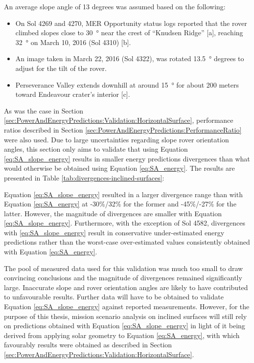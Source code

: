 An average slope angle of 13 degrees was assumed based on the following:
\begin{itemize}
  \item On Sol 4269 and 4270, \ac{MER} Opportunity status logs reported that the rover climbed slopes close to \SI{30}{\degree} near the crest of ``Knudsen Ridge'' [a], reaching \SI{32}{\degree} on March 10, 2016 (Sol 4310) [b].
  \item An image taken in March 22, 2016 (Sol 4322), was rotated \SI{13.5}{\degree} degrees to adjust for the tilt of the rover.
  \item Perseverance Valley extends downhill at around \SI{15}{\degree} for about 200 meters toward Endeavour crater's interior [c].
\end{itemize}

As was the case in Section \ref{sec:PowerAndEnergyPredictions:Validation:HorizontalSurface}, performance ratios described in Section \ref{sec:PowerAndEnergyPredictions:PerformanceRatio} were also used. Due to large uncertainties regarding slope rover orientation angles, this section only aims to validate that using Equation \ref{eq:SA_slope_energy} results in smaller energy predictions divergences than what would otherwise be obtained using Equation \ref{eq:SA_energy}. The results are presented in Table \ref{tab:divergences-inclined-surfaces}:



Equation \ref{eq:SA_slope_energy} resulted in a larger divergence range than with Equation \ref{eq:SA_energy} at -30\%/32\% for the former and -45\%/-27\% for the latter. However, the magnitude of divergences are smaller with Equation \ref{eq:SA_slope_energy}. Furthermore, with the exception of Sol 4582, divergences with \ref{eq:SA_slope_energy} result in conservative under-estimated energy predictions rather than the worst-case over-estimated values consistently obtained with Equation \ref{eq:SA_energy}.

The pool of measured data used for this validation was much too small to draw convincing conclusions and the magnitude of divergences remained significantly large. Inaccurate slope and rover orientation angles are likely to have contributed to unfavourable results. Further data will have to be obtained to validate Equation \ref{eq:SA_slope_energy} against reported measurements. However, for the purpose of this thesis, mission scenario analysis on inclined surfaces will still rely on predictions obtained with Equation \ref{eq:SA_slope_energy} in light of it being derived from applying solar geometry to Equation \ref{eq:SA_energy}, with which favourably results were obtained as described in Section \ref{sec:PowerAndEnergyPredictions:Validation:HorizontalSurface}.

